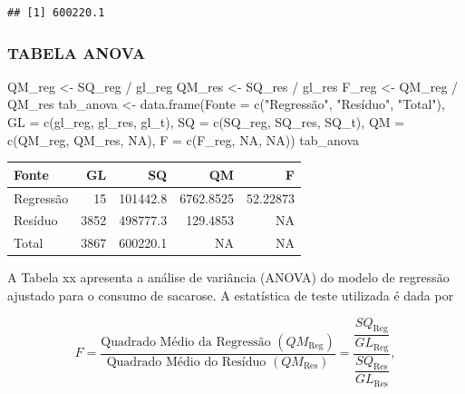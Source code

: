 \documentclass[
  brazilian,
  12pt,
  a4paper,
]{article}
\newenvironment{Shaded}{\begin{snugshade}}{\end{snugshade}}
\newcommand{\AttributeTok}[1]{\textcolor[rgb]{0.40,0.45,0.13}{#1}}
\newcommand{\ConstantTok}[1]{\textcolor[rgb]{0.56,0.35,0.01}{#1}}
\newcommand{\FunctionTok}[1]{\textcolor[rgb]{0.28,0.35,0.67}{#1}}
\newcommand{\NormalTok}[1]{\textcolor[rgb]{0.00,0.46,0.62}{#1}}
\newcommand{\OtherTok}[1]{\textcolor[rgb]{0.00,0.46,0.62}{#1}}
\newcommand{\SpecialCharTok}[1]{\textcolor[rgb]{0.37,0.37,0.37}{#1}}
\newcommand{\StringTok}[1]{\textcolor[rgb]{0.13,0.47,0.30}{#1}}
\begin{document}
\begin{verbatim}
## [1] 600220.1
\end{verbatim}

\subsubsection{TABELA ANOVA}\label{tabela-anova}

\begin{Shaded}
\begin{Highlighting}[]
\NormalTok{QM\_reg }\OtherTok{\textless{}{-}}\NormalTok{ SQ\_reg }\SpecialCharTok{/}\NormalTok{ gl\_reg}
\NormalTok{QM\_res }\OtherTok{\textless{}{-}}\NormalTok{ SQ\_res }\SpecialCharTok{/}\NormalTok{ gl\_res}
\NormalTok{F\_reg }\OtherTok{\textless{}{-}}\NormalTok{ QM\_reg }\SpecialCharTok{/}\NormalTok{ QM\_res}
\NormalTok{tab\_anova }\OtherTok{\textless{}{-}} \FunctionTok{data.frame}\NormalTok{(}\AttributeTok{Fonte =} \FunctionTok{c}\NormalTok{(}\StringTok{"Regressão"}\NormalTok{, }\StringTok{"Resíduo"}\NormalTok{, }\StringTok{"Total"}\NormalTok{),}
                        \AttributeTok{GL =} \FunctionTok{c}\NormalTok{(gl\_reg, gl\_res, gl\_t),}
                        \AttributeTok{SQ =} \FunctionTok{c}\NormalTok{(SQ\_reg, SQ\_res, SQ\_t),}
                        \AttributeTok{QM =} \FunctionTok{c}\NormalTok{(QM\_reg, QM\_res, }\ConstantTok{NA}\NormalTok{),}
                        \AttributeTok{F =} \FunctionTok{c}\NormalTok{(F\_reg, }\ConstantTok{NA}\NormalTok{, }\ConstantTok{NA}\NormalTok{))}
\NormalTok{tab\_anova}
\end{Highlighting}
\end{Shaded}

\begin{longtable}[]{@{}lrrrr@{}}
\toprule\noalign{}
Fonte & GL & SQ & QM & F \\
\midrule\noalign{}
\endhead
\bottomrule\noalign{}
\endlastfoot
Regressão & 15 & 101442.8 & 6762.8525 & 52.22873 \\
Resíduo & 3852 & 498777.3 & 129.4853 & NA \\
Total & 3867 & 600220.1 & NA & NA \\
\end{longtable}

A Tabela xx apresenta a análise de variância (ANOVA) do modelo de
regressão ajustado para o consumo de sacarose. A estatística de teste
utilizada é dada por

\[
F=\frac{\text{Quadrado Médio da Regressão }(QM_{\text{Reg}})}{\text{Quadrado Médio do Resíduo  }(QM_{\text{Res}})}=
\frac{\dfrac{SQ_{\text{Reg}}}{GL_{\text{Reg}}}}
{\dfrac{SQ_{\text{Res}}}{GL_{\text{Res}}}},
\]
\end{document}
